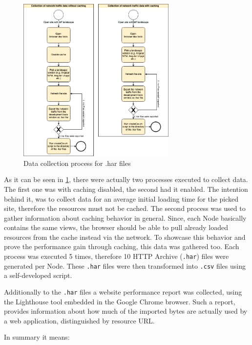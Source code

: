 \begin{figure}[!h]
	\centering
	\includegraphics[width=0.7\textwidth]{Figures/Data_Collection_Process_har.drawio.png}
	\caption{Data collection process for .har files}
	\label{fig:data_collection_process_har}
\end{figure}

As it can be seen in \ref{fig:data_collection_process_har}, there were actually two processes executed to collect data. The first one was with caching disabled, the second had it enabled. The intention behind it, was to collect data for an average initial loading time for the picked site, therefore the resources must not be cached. 
The second process was used to gather information about caching behavior in general. Since, each Node basically contains the same views, the browser should be able to pull already loaded resources from the cache instead via the network. To showcase this behavior and prove the performance gain through caching, this data was gathered too.
Each process was executed 5 times, therefore 10 HTTP Archive (\texttt{.har}) files were generated per Node. These \texttt{.har} files were then transformed into \texttt{.csv} files using a self-developed script. 

Additionally to the \texttt{.har} files a website performance report was collected, using the Lighthouse tool embedded in the Google Chrome browser. Such a report, provides information about how much of the imported bytes are actually used by a web application, distinguished by resource URL.

In summary it means:

